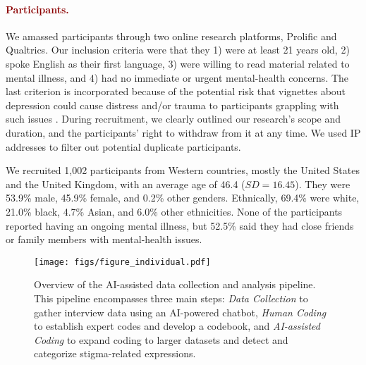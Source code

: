 \paragraph{\textcolor{darkred}{\textbf{Participants.}}}
We amassed participants through two online research platforms, Prolific and Qualtrics. 
Our inclusion criteria were that they 1) were at least 21 years old, 2) spoke English as their first language, 3) were willing to read material related to mental illness, and 4) had no immediate or urgent mental-health concerns. 
The last criterion is incorporated because of the potential risk that vignettes about depression could cause distress and/or trauma to participants grappling with such issues \cite{ethic_mental_illness_roberts_2002}.
During recruitment, we clearly outlined our research's scope and duration, and the participants' right to withdraw from it at any time. 
We used IP addresses to filter out potential duplicate participants. 

We recruited 1,002 participants from Western countries, mostly the United States and the United Kingdom, with an average age of 46.4 ($SD = 16.45$). 
They were 53.9\% male, 45.9\% female, and 0.2\% other genders. 
Ethnically, 69.4\% were white, 21.0\% black, 4.7\% Asian, and 6.0\% other ethnicities. 
None of the participants reported having an ongoing mental illness, but 52.5\% said they had close friends or family members with mental-health issues.


\begin{figure*}
    \centering
    \texttt{[image: figs/figure\_individual.pdf]}
    \caption{Overview of the AI-assisted data collection and analysis pipeline. This pipeline encompasses three main steps: \textit{Data Collection} to gather interview data using an AI-powered chatbot, \textit{Human Coding} to establish expert codes and develop a codebook, and \textit{AI-assisted Coding} to expand coding to larger datasets and detect and categorize stigma-related expressions.}
    \label{fig:individual}
\end{figure*}



